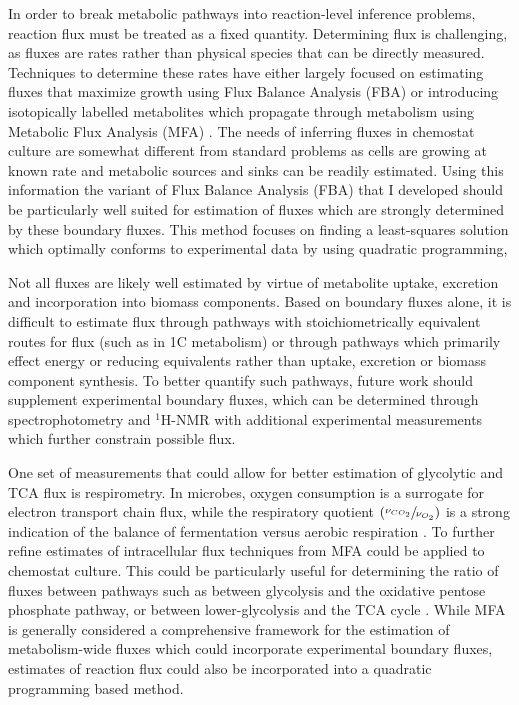 In order to break metabolic pathways into reaction-level inference problems, reaction flux must be treated as a fixed quantity. Determining flux is challenging, as fluxes are rates rather than physical species that can be directly measured. Techniques to determine these rates have either largely focused on estimating fluxes that maximize growth using Flux Balance Analysis (FBA) \cite{Orth:2010hb} or introducing isotopically labelled metabolites which propagate through metabolism using Metabolic Flux Analysis (MFA) \cite{Zamboni:2009bp}. The needs of inferring fluxes in chemostat culture are somewhat different from standard problems as cells are growing at known rate and metabolic sources and sinks can be readily estimated. Using this information the variant of Flux Balance Analysis (FBA) that I developed should be particularly well suited for estimation of fluxes which are strongly determined by these boundary fluxes. This method focuses on finding a least-squares solution which optimally conforms to experimental data by using quadratic programming, 

Not all fluxes are likely well estimated by virtue of metabolite uptake, excretion and incorporation into biomass components. Based on boundary fluxes alone, it is difficult to estimate flux through pathways with stoichiometrically equivalent routes for flux (such as in 1C metabolism) or through pathways which primarily effect energy or reducing equivalents rather than uptake, excretion or biomass component synthesis. To better quantify such pathways, future work should supplement experimental boundary fluxes, which can be determined through spectrophotometry and $^{1}$H-NMR with additional experimental measurements which further constrain possible flux.

One set of measurements that could allow for better estimation of glycolytic and TCA flux is respirometry.  In microbes, oxygen consumption is a surrogate for electron transport chain flux, while the respiratory quotient $\left(\sfrac{\nu_{CO_{2}}}{\nu_{O_{2}}}\right)$ is a strong indication of the balance of fermentation versus aerobic respiration \cite{Boer:2003fi,BARFORD:1979ei}. To further refine estimates of intracellular flux techniques from MFA could be applied to chemostat culture. This could be particularly useful for determining the ratio of fluxes between pathways such as between glycolysis and the oxidative pentose phosphate pathway, or between lower-glycolysis and the TCA cycle \cite{Sauer:2006ii, Jazmin:2013fg, Kromer:2014wr}. While MFA is generally considered a comprehensive framework for the estimation of metabolism-wide fluxes which could incorporate experimental boundary fluxes, estimates of reaction flux could also be incorporated into a quadratic programming based method.

